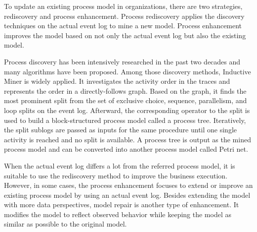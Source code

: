 To update an existing process model in organizations, there are two strategies, rediscovery and process enhancement. Process rediscovery applies the discovery techniques on the actual event log to mine a new model. Process enhancement improves the model based on not only the actual event log but also the existing model. 


Process discovery has been intensively researched in the past two decades and many algorithms have been proposed\cite{van2016data}. Among those discovery methods, Inductive Miner is widely applied\cite{leemans2013discovering}. It investigates the activity order in the traces and represents the order in a directly-follows graph. Based on the graph, it finds the most prominent split from the set of exclusive choice, sequence, parallelism, and loop splits on the event log.  Afterward, the corresponding operator to the split is used to build a block-structured process model called a process tree. Iteratively, the  split sublogs are passed as inputs for the same procedure until one single activity is reached and no split is available. A process tree is output as the mined process model and can be converted into another process model called Petri net. %


When the actual event log differs a lot from the referred process model, it is suitable to use the rediscovery method to improve the business execution. However, in some cases, the process enhancement focuses to extend or improve an existing process model by using an actual event log\cite{van2011process}. Besides extending the model with more data perspectives, model repair is another type of enhancement. It modifies the model to reflect observed behavior while keeping the model as similar as possible to the original model.

